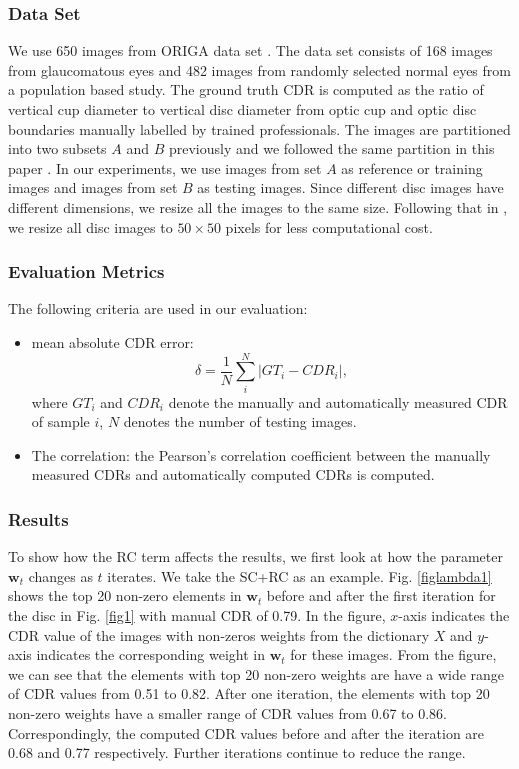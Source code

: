 \documentclass[journal]{IEEEtran}
\begin{document}
\subsubsection{Data Set}
We use 650 images from ORIGA data set \cite{origa}. The data set
consists of 168 images from glaucomatous eyes and 482 images from
randomly selected normal eyes from a population based study.
The ground truth CDR is computed as the ratio of vertical cup diameter to vertical disc diameter from optic cup and optic disc boundaries manually labelled by trained professionals. 
The images are partitioned into two subsets $A$ and $B$ previously and we followed the same partition in this paper \cite{Cheng:17BOE}. In our experiments, we use images from set $A$ as reference or training images and images from set $B$ as testing images.
  Since different disc images have different dimensions, we resize all the images to  the same size. Following that in \cite{CJ15}, we resize all disc images to $50\times 50$ pixels for less computational cost. 
%  
 \subsubsection{Evaluation Metrics}
The following criteria are used in our evaluation:
 \begin{itemize} 
 	 \item mean absolute CDR error: \begin{equation} \delta=\frac{1}{N}\sum_i^N |GT_{i}-CDR_i|,
 \end{equation} where
$GT_{i}$ and $CDR_i$ denote the manually and automatically measured CDR of sample
$i$, $N$ denotes the number of testing images.
 \item The correlation:  the Pearson's correlation
coefficient between the manually measured CDRs and automatically computed CDRs is computed.
  \end{itemize}
 \subsubsection{Results}
 To show how the RC term affects the results, we first look at how the parameter $\textbf{w}_t$ changes as $t$ iterates. We take the SC+RC as an example. %
 Fig. \ref{figlambda1} shows the top 20 non-zero elements in $\textbf{w}_t$ before and after the first iteration   for the disc in Fig. \ref{fig1} with manual CDR of 0.79. In the figure,   $x$-axis indicates the CDR value of the images with non-zeros weights from the dictionary $X$ and $y$-axis indicates the corresponding weight in $\textbf{w}_t$ for these images. From the figure, we can see that the elements with top 20 non-zero weights are have a wide range of CDR values from 0.51 to 0.82. After one iteration, the elements with top 20 non-zero weights have a smaller range of CDR values from  0.67 to 0.86.  
  Correspondingly, the computed CDR values before and after the iteration are 0.68 and 0.77  respectively. Further iterations  continue  to reduce the range. 
 
\end{document}
